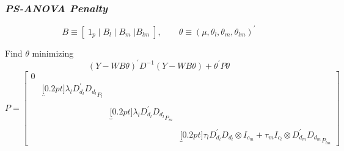 \documentclass[12pt]{beamer}
\newcommand{\ms}{\scriptscriptstyle}
\begin{document}
\begin{frame}
\frametitle{\emph{PS-ANOVA Penalty}}

\[
B \equiv \left[\; 1_p \; \vert \;  B_l  \; \vert \;   B_m \; \vert B_{\ms{lm}} \; \right] ,   \qquad  \theta \equiv \left(\mu, \theta_{\ms{l}},\theta_{\ms{m}},\theta_{\ms{lm}}\right)^\prime            
\]

Find $\theta$ minimizing
\begin{equation} \label{eq:PS-ANOVA}
\left(Y-WB\theta\right)^\prime D^{-1}\left(Y-WB\theta\right) + \theta^\prime P \theta
\end{equation}
\begin{equation*}
P  = \begin{bmatrix}
0 &&&\\
& \underbracket[0.2pt]{\lambda_l D_{\ms{d_l}}^\prime D_{\ms{d_l}}}_{\text{$P_{\ms l}$}}	& 	& \\
&&& \\
&	&	\underbracket[0.2pt]{\lambda_l D_{\ms{d_l}}^\prime D_{\ms{d_l}}}_{\text{$P_{\ms m}$}}	& 	\\
&&&\\
&&&	\underbracket[0.2pt]{\tau_l D_{\ms{d_l}}^\prime D_{\ms{d_l}} \otimes I_{\ms{c_m}} + \tau_m I_{\ms{c_l}} \otimes D_{\ms{d_m}}^\prime D_{\ms{d_m}}}_{\text{$P_{\ms lm}$}}
\end{bmatrix}
\end{equation*}


\end{frame}








\end{document}
